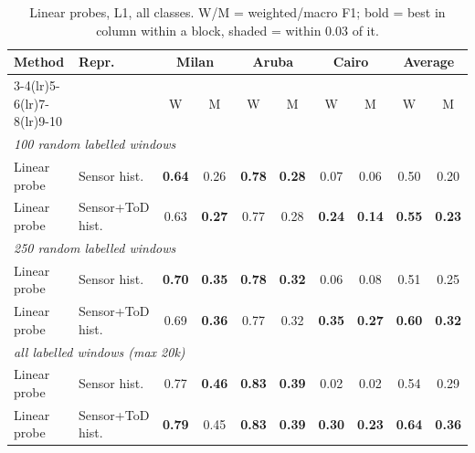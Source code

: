 \begin{table}[H]
\centering\small
\caption{Linear probes, L1, all classes. W/M = weighted/macro F1; bold = best in column within a block, shaded = within 0.03 of it.}
\label{tab:probe_l1_all}
\setlength{\tabcolsep}{3.5pt}
\begin{tabular}{llcc|cc|cc|cc}
\toprule
Method & Repr. & \multicolumn{2}{c}{Milan} & \multicolumn{2}{c}{Aruba} & \multicolumn{2}{c}{Cairo} & \multicolumn{2}{c}{Average} \\
\cmidrule(lr){3-4}\cmidrule(lr){5-6}\cmidrule(lr){7-8}\cmidrule(lr){9-10}
 & & W & M & W & M & W & M & W & M \\
\midrule
\multicolumn{10}{l}{\textit{100 random labelled windows}} \\
\midrule
Linear probe & Sensor hist. & \cellcolor{blue!12}\textbf{0.64} & \cellcolor{blue!12}0.26 & \cellcolor{blue!12}\textbf{0.78} & \cellcolor{blue!12}\textbf{0.28} & 0.07 & 0.06 & 0.50 & \cellcolor{blue!12}0.20 \\
Linear probe & Sensor+ToD hist. & \cellcolor{blue!12}0.63 & \cellcolor{blue!12}\textbf{0.27} & \cellcolor{blue!12}0.77 & \cellcolor{blue!12}0.28 & \cellcolor{blue!12}\textbf{0.24} & \cellcolor{blue!12}\textbf{0.14} & \cellcolor{blue!12}\textbf{0.55} & \cellcolor{blue!12}\textbf{0.23} \\
\midrule
\multicolumn{10}{l}{\textit{250 random labelled windows}} \\
\midrule
Linear probe & Sensor hist. & \cellcolor{blue!12}\textbf{0.70} & \cellcolor{blue!12}\textbf{0.35} & \cellcolor{blue!12}\textbf{0.78} & \cellcolor{blue!12}\textbf{0.32} & 0.06 & 0.08 & 0.51 & 0.25 \\
Linear probe & Sensor+ToD hist. & \cellcolor{blue!12}0.69 & \cellcolor{blue!12}\textbf{0.36} & \cellcolor{blue!12}0.77 & \cellcolor{blue!12}0.32 & \cellcolor{blue!12}\textbf{0.35} & \cellcolor{blue!12}\textbf{0.27} & \cellcolor{blue!12}\textbf{0.60} & \cellcolor{blue!12}\textbf{0.32} \\
\midrule
\multicolumn{10}{l}{\textit{all labelled windows (max 20k)}} \\
\midrule
Linear probe & Sensor hist. & \cellcolor{blue!12}0.77 & \cellcolor{blue!12}\textbf{0.46} & \cellcolor{blue!12}\textbf{0.83} & \cellcolor{blue!12}\textbf{0.39} & 0.02 & 0.02 & 0.54 & 0.29 \\
Linear probe & Sensor+ToD hist. & \cellcolor{blue!12}\textbf{0.79} & \cellcolor{blue!12}0.45 & \cellcolor{blue!12}\textbf{0.83} & \cellcolor{blue!12}\textbf{0.39} & \cellcolor{blue!12}\textbf{0.30} & \cellcolor{blue!12}\textbf{0.23} & \cellcolor{blue!12}\textbf{0.64} & \cellcolor{blue!12}\textbf{0.36} \\
\bottomrule
\end{tabular}
\end{table}

